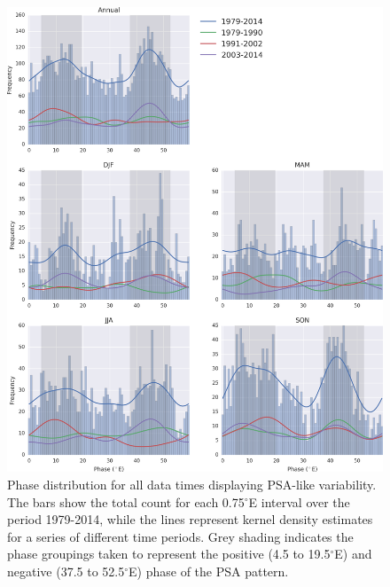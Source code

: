 \begin{figure}
\begin{center}
\includegraphics[width=0.98\columnwidth]{figures/psa/psa-phase-histogram_wave6_ERAInterim_500hPa-lat10S10Nmean-lon115E235Ezeropad_030day-runmean-anom-wrt-all_native-np20N260E.png}
\caption[Phase distribution for all data times displaying PSA-like variability]{\label{fig:phase_distribution}
Phase distribution for all data times displaying PSA-like variability. The bars show the total count for each 0.75$^{\circ}$E interval over the period 1979-2014, while the lines represent kernel density estimates for a series of different time periods. Grey shading indicates the phase groupings taken to represent the positive (4.5 to 19.5$^{\circ}$E) and negative (37.5 to 52.5$^{\circ}$E) phase of the PSA pattern.%
}
\end{center}
\end{figure}

